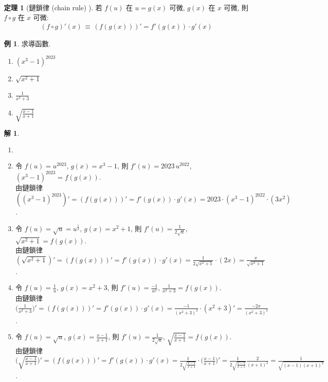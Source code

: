 \documentclass[12pt,a4paper]{extarticle}
\newcommand{\ds}{\displaystyle}
\theoremstyle{definition}
\newtheorem*{thm}{定理}
\newtheorem*{ex}{例}
\newtheorem*{sol}{解}
\begin{document}
\begin{thm}[鏈鎖律 (chain rule) ]
  若 $f(u)$ 在 $u = g(x)$ 可微, $g(x)$ 在 $x$ 可微, 則 $f\circ g$ 在 $x$ 可微: 
  \begin{align*}
    (f\circ g)'(x)\,\equiv\,(f(g(x)))' = f'(g(x))\cdot g'(x)
  \end{align*}
\end{thm}

\begin{ex} 求導函數.
  \begin{multicols}{4}
    \begin{enumerate}\setlength\itemsep{0em}
      \item $(x^3 - 1)^{2023}$
      \item $\sqrt{x^2 + 1}$
      \item $\frac{1}{x^2 + 3}$
      \item $\sqrt{\frac{x - 1}{x + 1}}$
    \end{enumerate}
  \end{multicols}
\end{ex}

\begin{sol}
  \begin{enumerate}\setlength\itemsep{0em}
    \item[]
    \item 令 $\ds f(u) = u^{2023}$, $g(x) = x^3 - 1$, 則 $\ds f'(u) = 2023\,u^{2022}$, $\ds(x^3 - 1)^{2023} = f(g(x))$. \\由鏈鎖律 $\ds((x^3 - 1)^{2023})' = (f(g(x)))' = f'(g(x))\cdot g'(x) = 2023\cdot(x^3 - 1)^{2022}\cdot(3x^2)$. 
    \item 令 $\ds f(u) = \sqrt{u} = u^{\frac{1}{2}}$, $g(x) = x^2 + 1$, 則 $\ds f'(u) = \frac{1}{2\sqrt{u}}$, $\ds\sqrt{x^2 + 1} = f(g(x))$. \\由鏈鎖律 $\ds (\sqrt{x^2 + 1})' = (f(g(x)))' = f'(g(x))\cdot g'(x) = \frac{1}{2\sqrt{x^2 + 1}}\cdot(2x) = \frac{x}{\sqrt{x^2 + 1}}$. 
    \item 令 $\ds f(u) = \frac{1}{u}$, $g(x) = x^2 + 3$, 則 $\ds f'(u) = \frac{-1}{u^2}$, $\ds\frac{1}{x^2 + 3} = f(g(x))$. \\由鏈鎖律 $\ds\Big(\frac{1}{x^2 + 3}\Big)' = (f(g(x)))' = f'(g(x))\cdot g'(x) = \frac{-1}{(x^2 + 3)^2}\cdot(x^2 + 3)' = \frac{-2x}{(x^2 + 3)^2}$. 
    \item 令 $\ds f(u) = \sqrt{u}$, $\ds g(x) = \frac{x - 1}{x + 1}$, 則 $\ds f'(u) = \frac{1}{2\sqrt{u}}$, $\ds\sqrt{\frac{x - 1}{x + 1}} = f(g(x))$. \\由鏈鎖律 $\ds\bigg(\sqrt{\frac{x - 1}{x + 1}}\bigg)' = (f(g(x)))' = f'(g(x))\cdot g'(x) = \frac{1}{2\sqrt{\frac{x - 1}{x + 1}}}\cdot\Big(\frac{x - 1}{x + 1}\Big)' = \frac{1}{2\sqrt{\frac{x - 1}{x + 1}}}\frac{2}{(x + 1)^2} = \frac{1}{\sqrt{(x - 1)(x + 1)^3}}$. 
  \end{enumerate}
\end{sol}
\end{document}
